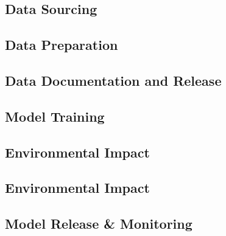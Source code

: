 \tocless\subsection{Data Sourcing}










\tocless\subsection{Data Preparation}











\tocless\subsection{Data Documentation and Release}





\tocless\subsection{Model Training}






\tocless\subsection{Environmental Impact}




\tocless\subsection{Environmental Impact}






\tocless\subsection{Model Release \& Monitoring}




